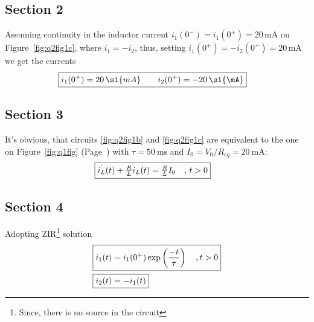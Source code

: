 \documentclass[11pt,a4paper,titlepage]{article}
\makeatletter
\let\reftagform@=\tagform@
\def\tagform@#1{\maketag@@@{(\ignorespaces\textcolor{red}{#1}\unskip\@@italiccorr)}}
\renewcommand{\eqref}[1]{\textup{\reftagform@{\ref{#1}}}}
\makeatother
\begin{document}
{\subsection{Section 2}{
Assuming continuity in the inductor current $i_1(0^-)=i_1(0^+)=20\,\si{\mA}$ on Figure~\ref{fig:q2fig1c}, where $i_1=-i_2$, thus, setting $i_1(0^+)=-i_2(0^+)=20\,\si{\mA}$ we get the currents
\begin{align*}
\Aboxed{i_1(0^+)=20\,\si{mA} \qquad i_2(0^+)=-20\,\si{\mA}}
\end{align*}
}
\subsection{Section 3}{It's obvious, that circuits \ref{fig:q2fig1b} and \ref{fig:q2fig1c} are equivalent to the one on Figure~\ref{fig:q1fig} (Page~\pageref{fig:q1fig}) with $\tau=50~\si{\ms}$ and $I_0=V_0/R_{eq}=20~\si{\mA}$:
\begin{align}
\Aboxed{\dot{i_L}(t)+\tfrac{R}{L}i_L(t)&=\tfrac{R}{L}I_0 \quad,\, t>0}
\end{align}
}
\subsection{Section 4}{Adopting ZIR\footnote{Since, there is no source in the circuit} solution~\eqref{eq:7} 
\begin{align*}
\Aboxed{i_1(t)&=i_1(0^+)\exp\left({\dfrac{-t}{\tau}}\right) \quad, t>0} \\
\Aboxed{i_2(t)&=-i_1(t)}
\end{align*}
}
}\label{sec:q2sec}
\end{document}
